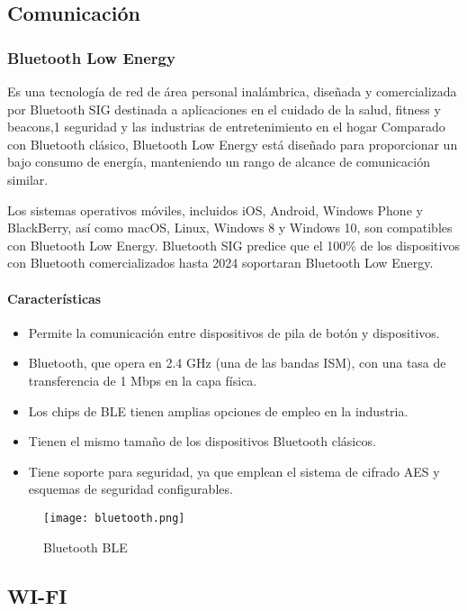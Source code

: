     \subsection{Comunicación}
        \subsubsection{Bluetooth Low Energy}
            Es una tecnología de red de área personal inalámbrica, diseñada y comercializada por Bluetooth SIG
            destinada a aplicaciones en el cuidado de la salud, fitness y beacons,1 seguridad y las industrias 
            de entretenimiento en el hogar Comparado con Bluetooth clásico, Bluetooth Low Energy está diseñado 
            para proporcionar un bajo consumo de energía, manteniendo un rango de alcance de comunicación similar.

            Los sistemas operativos móviles, incluidos iOS, Android, Windows Phone y BlackBerry, así como macOS, 
            Linux, Windows 8 y Windows 10, son compatibles con Bluetooth Low Energy. Bluetooth SIG predice que 
            el 100\% de los dispositivos con Bluetooth comercializados hasta 2024 soportaran Bluetooth Low Energy.

    \paragraph{Características}
        \begin{itemize}
            \item Permite la comunicación entre dispositivos de pila de botón y dispositivos.
            \item Bluetooth, que opera en 2.4 GHz (una de las bandas ISM), con una tasa de transferencia de 1 Mbps en la capa física.
            \item Los chips de BLE tienen amplias opciones de empleo en la industria.
            \item Tienen el mismo tamaño de los dispositivos Bluetooth clásicos.
            \item Tiene soporte para seguridad, ya que emplean el sistema de cifrado AES y esquemas de seguridad configurables.
        \end{itemize}

    \begin{figure}[htp!]
        \centering
        \texttt{[image: bluetooth.png]}
        \caption{Bluetooth BLE}
        \label{fig: Bluetooth}
    \end{figure}
    \FloatBarrier

    \subsection{WI-FI}

